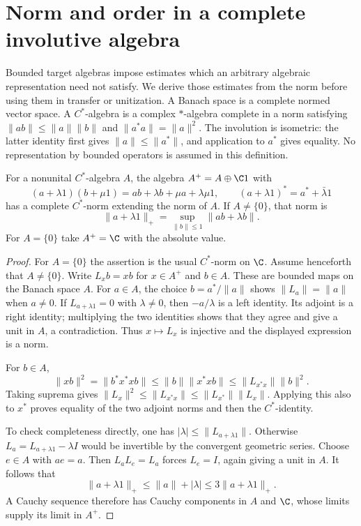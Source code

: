 \section{Norm and order in a complete involutive algebra}
\label{sec:cstar-prerequisites}

Bounded target algebras impose estimates which an arbitrary algebraic
representation need not satisfy.  We derive those estimates from the norm
before using them in transfer or unitization.
A Banach space is a complete normed vector space.
A $C^*$-algebra is a complex $*$-algebra complete in a norm satisfying
$\|ab\|\leq\|a\|\|b\|$ and $\|a^*a\|=\|a\|^2$.
The involution is isometric: the latter identity first gives
$\|a\|\leq\|a^*\|$, and application to $a^*$ gives equality.
No representation by bounded operators is assumed in this definition.

\begin{lemma}
For\label{lem:cstar-adjoin} a nonunital $C^*$-algebra $A$, the algebra $A^+=A\oplus\C1$ with
\[
 (a+\lambda1)(b+\mu1)=ab+\lambda b+\mu a+\lambda\mu1,
 \qquad (a+\lambda1)^*=a^*+\bar\lambda1
\]
has a complete $C^*$-norm extending the norm of $A$.
If $A\ne\{0\}$, that norm is
\[
 \|a+\lambda1\|_+=\sup_{\|b\|\leq1}\|ab+\lambda b\|.
\]
For $A=\{0\}$ take $A^+=\C$ with the absolute value.
\end{lemma}

\begin{proof}
For $A=\{0\}$ the assertion is the usual $C^*$-norm on $\C$.
Assume henceforth that $A\ne\{0\}$.
Write $L_xb=xb$ for $x\in A^+$ and $b\in A$.
These are bounded maps on the Banach space $A$.
For $a\in A$, the choice $b=a^*/\|a\|$ shows
$\|L_a\|=\|a\|$ when $a\ne0$.
If $L_{a+\lambda1}=0$ with $\lambda\ne0$, then $-a/\lambda$ is a left
identity.  Its adjoint is a right identity; multiplying the two identities
shows that they agree and give a unit in $A$, a contradiction.
Thus $x\mapsto L_x$ is injective and the displayed expression is a norm.

For $b\in A$,
\[
 \|xb\|^2=\|b^*x^*xb\|
 \leq\|b\|\|x^*xb\|\leq\|L_{x^*x}\|\|b\|^2.
\]
Taking suprema gives
$\|L_x\|^2\leq\|L_{x^*x}\|\leq\|L_{x^*}\|\|L_x\|$.
Applying this also to $x^*$ proves equality of the two adjoint norms and
then the $C^*$-identity.

To check completeness directly, one has $|\lambda|\leq\|L_{a+\lambda1}\|$.
Otherwise $L_a=L_{a+\lambda1}-\lambda I$ would be invertible by the
convergent geometric series.  Choose $e\in A$ with $ae=a$.
Then $L_aL_e=L_a$ forces $L_e=I$, again giving a unit in $A$.
It follows that
\[
 \|a+\lambda1\|_+\leq\|a\|+|\lambda|
 \leq3\|a+\lambda1\|_+.
\]
A Cauchy sequence therefore has Cauchy components in $A$ and $\C$, whose
limits supply its limit in $A^+$.
\end{proof}

